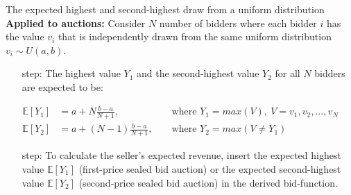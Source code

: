 \begin{frame}{The expected highest and second-highest draw from a uniform distribution}
    \textbf{Applied to auctions:} Consider $N$ number of bidders where each bidder $i$ has the value $v_i$ that is independently drawn from the same uniform distribution $v_i\sim U(a,b)$.
    \begin{itemize}
      \item[\nth{1} step:] The highest value $Y_1$ and the second-highest value $Y_2$ for all $N$ bidders are expected to be:
    \end{itemize}
    \begin{align*}
      \mathbb{E}[Y_1]&=a+N\frac{b-a}{N+1},&&\text{ where }Y_1=max(V),\ V=v_1,v_2,...,v_N\\
      \mathbb{E}[Y_2]&=a+(N-1)\frac{b-a}{N+1},&&\text{ where }Y_2=max(V\neq Y_1)
    \end{align*}
    \begin{itemize}
      \item[\nth{2} step:] To calculate the seller's expected revenue, insert the expected highest value $\mathbb{E}[Y_1]$ (first-price sealed bid auction) or the expected second-highest value $\mathbb{E}[Y_2]$ (second-price sealed bid auction) in the derived bid-function.
    \end{itemize}
    \vfill\null
\end{frame}

